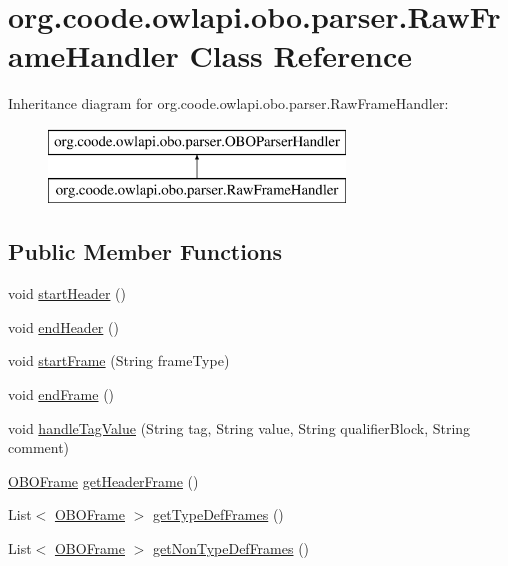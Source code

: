 \hypertarget{classorg_1_1coode_1_1owlapi_1_1obo_1_1parser_1_1_raw_frame_handler}{\section{org.\-coode.\-owlapi.\-obo.\-parser.\-Raw\-Frame\-Handler Class Reference}
\label{classorg_1_1coode_1_1owlapi_1_1obo_1_1parser_1_1_raw_frame_handler}
}
Inheritance diagram for org.\-coode.\-owlapi.\-obo.\-parser.\-Raw\-Frame\-Handler\-:\begin{figure}[H]
\begin{center}
\leavevmode
\includegraphics[height=2.000000cm]{classorg_1_1coode_1_1owlapi_1_1obo_1_1parser_1_1_raw_frame_handler}
\end{center}
\end{figure}
\subsection*{Public Member Functions}
\begin{DoxyCompactItemize}
\item 
void \hyperlink{classorg_1_1coode_1_1owlapi_1_1obo_1_1parser_1_1_raw_frame_handler_aedb613cecc15a1b2ddf2ca768951d686}{start\-Header} ()
\item 
void \hyperlink{classorg_1_1coode_1_1owlapi_1_1obo_1_1parser_1_1_raw_frame_handler_a30b99160bc3ca7c0494d46690a0ac5e5}{end\-Header} ()
\item 
void \hyperlink{classorg_1_1coode_1_1owlapi_1_1obo_1_1parser_1_1_raw_frame_handler_a5dbccaebe1d49a5896d4fe8611a02116}{start\-Frame} (String frame\-Type)
\item 
void \hyperlink{classorg_1_1coode_1_1owlapi_1_1obo_1_1parser_1_1_raw_frame_handler_ae4b8fd46ce4d06dd5ae44a3814b50950}{end\-Frame} ()
\item 
void \hyperlink{classorg_1_1coode_1_1owlapi_1_1obo_1_1parser_1_1_raw_frame_handler_ae91212d6a42bf4c6332dae011d79d8b2}{handle\-Tag\-Value} (String tag, String value, String qualifier\-Block, String comment)
\item 
\hyperlink{classorg_1_1coode_1_1owlapi_1_1obo_1_1parser_1_1_o_b_o_frame}{O\-B\-O\-Frame} \hyperlink{classorg_1_1coode_1_1owlapi_1_1obo_1_1parser_1_1_raw_frame_handler_a6e4811b81529d5822447a988708a8630}{get\-Header\-Frame} ()
\item 
List$<$ \hyperlink{classorg_1_1coode_1_1owlapi_1_1obo_1_1parser_1_1_o_b_o_frame}{O\-B\-O\-Frame} $>$ \hyperlink{classorg_1_1coode_1_1owlapi_1_1obo_1_1parser_1_1_raw_frame_handler_a88894e531b7045627f47d2841d020821}{get\-Type\-Def\-Frames} ()
\item 
List$<$ \hyperlink{classorg_1_1coode_1_1owlapi_1_1obo_1_1parser_1_1_o_b_o_frame}{O\-B\-O\-Frame} $>$ \hyperlink{classorg_1_1coode_1_1owlapi_1_1obo_1_1parser_1_1_raw_frame_handler_a1dc65934ccc2f69b2c2a94f3451df4fd}{get\-Non\-Type\-Def\-Frames} ()
\end{DoxyCompactItemize}
